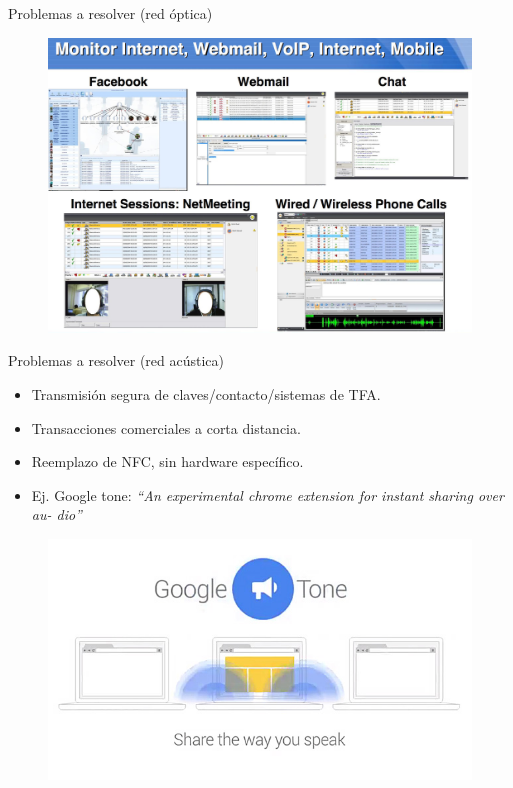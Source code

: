 \documentclass[aspectratio=169]{beamer}
\begin{document}
\begin{frame}{Problemas a resolver (red óptica)}
\begin{figure}[t]
  \centering
  \includegraphics[width=0.75 \textwidth]{graphs/glimmer2.jpg} 
\end{figure}
\end{frame}


\begin{frame}{Problemas a resolver (red acústica)}

\begin{itemize}
 \item Transmisión segura de claves/contacto/sistemas de TFA.
 \item Transacciones comerciales a corta distancia.
 \item Reemplazo de NFC, sin hardware específico.
 \item Ej. Google tone: \textit{``An experimental chrome extension for instant sharing over au-
dio''}
 \end{itemize}
 
 \begin{figure}[t]
  \centering
  \includegraphics[width=0.65 \textwidth]{graphs/google_tone.jpg} 
\end{figure}
\end{frame}
\end{document}
